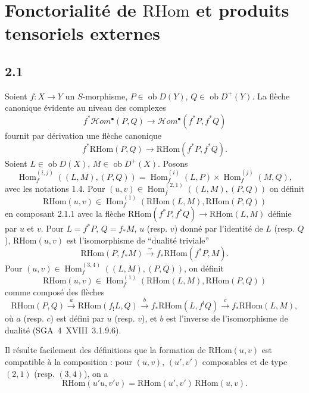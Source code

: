 \documentclass[11pt]{article}
\DeclareMathOperator{\Hom}{Hom}
\newcommand{\ob}{\operatorname{ob}}
\providecommand{\RHom}{\mathrm{RHom}}
\providecommand{\RHom}{\mathrm{RHom}}
\providecommand{\Hom}{\operatorname{Hom}}
\providecommand{\ob}{\operatorname{ob}}
\providecommand{\RHom}{\mathrm R\mathcal{H}om}
\providecommand{\RHom}{\mathrm{RHom}}
\providecommand{\Hom}{\operatorname{Hom}}
\begin{document}
\section{Fonctorialité de $\RHom$ et produits tensoriels externes}

\subsection*{2.1}
Soient $f:X\to Y$ un $S$-morphisme, $P\in\ob D(Y)$, $Q\in\ob D^{+}(Y)$. La flèche canonique évidente au niveau des complexes
\[
f^{*}\mathcal Hom^{\bullet}(P,Q)\longrightarrow\mathcal Hom^{\bullet}(f^{*}P,f^{*}Q)
\]
fournit par dérivation une flèche canonique
\begin{equation}\tag{2.1.1}
f^{*}\RHom(P,Q)\longrightarrow\RHom(f^{*}P,f^{*}Q).
\end{equation}
Soient $L\in\ob D(X)$, $M\in\ob D^{+}(X)$. Posons
\begin{equation}\tag{2.1.2}
\Hom_f^{(i,j)}((L,M),(P,Q))=\Hom_f^{(i)}(L,P)\times\Hom_f^{(j)}(M,Q),
\end{equation}
avec les notations 1.4. Pour $(u,v)\in\Hom_f^{(2,1)}((L,M),(P,Q))$ on définit
\begin{equation}\tag{2.1.3}
\RHom(u,v)\in\Hom_f^{(1)}(\RHom(L,M),\RHom(P,Q))
\end{equation}
en composant 2.1.1 avec la flèche $\RHom(f^{*}P,f^{*}Q)\to\RHom(L,M)$ définie par $u$ et $v$. Pour $L=f^{*}P$, $Q=f_{*}M$, $u$ (resp. $v$) donné par l'identité de $L$ (resp. $Q$), $\RHom(u,v)$ est l'isomorphisme de ``dualité triviale''
\begin{equation}\tag{2.1.4}
\RHom(P,f_{*}M)\xrightarrow{\sim}f_{*}\RHom(f^{*}P,M).
\end{equation}
Pour $(u,v)\in\Hom_f^{(3,4)}((L,M),(P,Q))$, on définit
\begin{equation}\tag{2.1.5}
\RHom(u,v)\in\Hom_f^{(1)}(\RHom(L,M),\RHom(P,Q))
\end{equation}
comme composé des flèches
\[
\RHom(P,Q)\xrightarrow{a}\RHom(f_{!}L,Q)\xrightarrow{b}f_{*}\RHom(L,f^{!}Q)\xrightarrow{c}f_{*}\RHom(L,M),
\]
où $a$ (resp. $c$) est défini par $u$ (resp. $v$), et $b$ est l'inverse de l'isomorphisme de dualité (SGA~4~XVIII~3.1.9.6).

Il résulte facilement des définitions que la formation de $\RHom(u,v)$ est compatible à la composition : pour $(u,v)$, $(u',v')$ composables et de type $(2,1)$ (resp. $(3,4)$), on a
\begin{equation}\tag{2.1.6}
\RHom(u'u,v'v)=\RHom(u',v')\,\RHom(u,v).
\end{equation}
\end{document}
